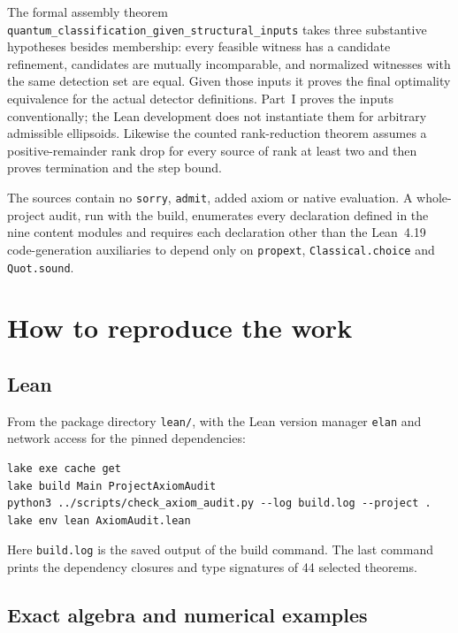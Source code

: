 The formal assembly theorem \texttt{quantum\_classification\_given\_structural\_inputs} takes three substantive hypotheses besides membership: every feasible witness has a candidate refinement, candidates are mutually incomparable, and normalized witnesses with the same detection set are equal. Given those inputs it proves the final optimality equivalence for the actual detector definitions. Part~I proves the inputs conventionally; the Lean development does not instantiate them for arbitrary admissible ellipsoids. Likewise the counted rank-reduction theorem assumes a positive-remainder rank drop for every source of rank at least two and then proves termination and the step bound.

The sources contain no \texttt{sorry}, \texttt{admit}, added axiom or native evaluation. A whole-project audit, run with the build, enumerates every declaration defined in the nine content modules and requires each declaration other than the Lean~4.19 code-generation auxiliaries to depend only on \texttt{propext}, \texttt{Classical.choice} and \texttt{Quot.sound}.

\section{How to reproduce the work}

\subsection{Lean}

From the package directory \texttt{lean/}, with the Lean version manager \texttt{elan} and network access for the pinned dependencies:
\begin{Verbatim}[fontsize=\small]
lake exe cache get
lake build Main ProjectAxiomAudit
python3 ../scripts/check_axiom_audit.py --log build.log --project .
lake env lean AxiomAudit.lean
\end{Verbatim}
Here \texttt{build.log} is the saved output of the build command. The last command prints the dependency closures and type signatures of 44 selected theorems.

\subsection{Exact algebra and numerical examples}

